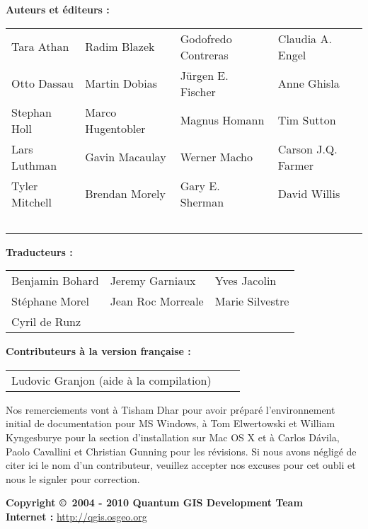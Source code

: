 \newpage

\begin{flushleft}
\textbf{Auteurs et éditeurs :}
 
\begin{tabular}{p{4cm} p{4cm} p{4cm} p{4cm}}
Tara Athan & Radim Blazek & Godofredo Contreras & Claudia A. Engel \\
Otto Dassau & Martin Dobias & J\"urgen E. Fischer & Anne Ghisla \\ 
Stephan Holl & Marco Hugentobler & Magnus Homann & Tim Sutton \\ 
Lars Luthman & Gavin Macaulay & Werner Macho & Carson J.Q. Farmer \\
Tyler Mitchell & Brendan Morely & Gary E. Sherman & David Willis \\ \
\end{tabular}
\end{flushleft}

\begin{flushleft}
\textbf{Traducteurs :}
 
\begin{tabular}{p{5cm} p{5cm} p{5cm}}
Benjamin Bohard & Jeremy Garniaux & Yves Jacolin \\
Stéphane Morel & Jean Roc Morreale & Marie Silvestre \\
Cyril de Runz \\
\end{tabular}
\end{flushleft}

\begin{flushleft}
\textbf{Contributeurs à la version française :}

\begin{tabular}{p{5cm} p{5cm} p{5cm}}
Ludovic Granjon (aide à la compilation) \\
\end{tabular}
\vspace{1cm}

Nos remerciements vont à Tisham Dhar pour avoir préparé l'environnement initial de documentation pour MS Windows, à Tom Elwertowski et William Kyngesburye pour la section d'installation sur Mac OS X et à Carlos  D\'{a}vila, Paolo Cavallini et Christian Gunning pour les révisions. Si nous avons négligé de citer ici le nom d'un contributeur, veuillez accepter nos excuses pour cet oubli et nous le signler pour correction.

\textbf{Copyright \copyright~2004 - 2010 Quantum GIS Development Team} \\
\textbf{Internet :} \url{http://qgis.osgeo.org}
\end{flushleft}
